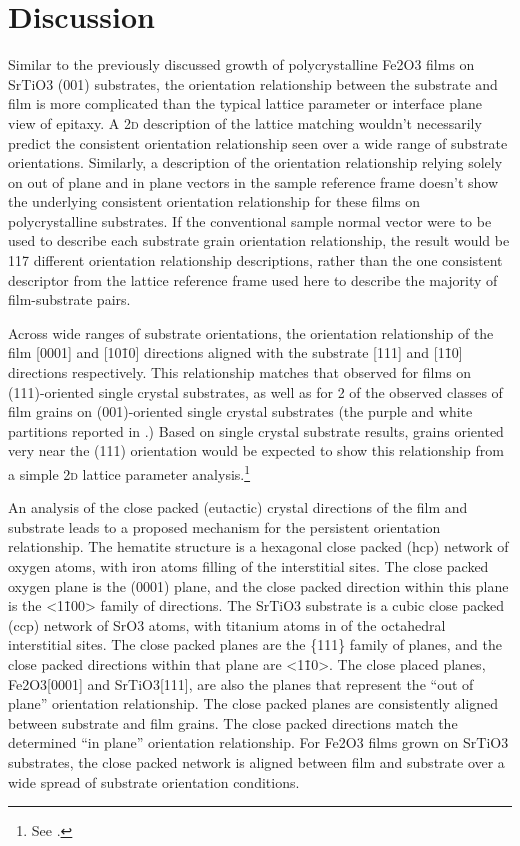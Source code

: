 \documentclass[12pt,%
              twoside,
               letterpaper]{uiothesis}
\begin{document}
\section{Discussion}
\label{sec:poly.growth.discussion}
		
		
Similar to the previously discussed growth of polycrystalline Fe2O3 films on
SrTiO3 (001) substrates, the orientation relationship between the substrate and film
is more complicated than the typical lattice parameter or interface plane view of epitaxy.
A 2\textsc{d} description of the lattice matching wouldn't necessarily predict the
consistent orientation relationship seen over a wide range of substrate orientations.
Similarly, a description of the orientation relationship relying solely on out of plane
and in plane vectors in the sample reference frame doesn't show the underlying consistent
orientation relationship for these films on polycrystalline substrates. If the
conventional sample normal vector were to be used to describe each substrate grain
orientation relationship, the result would be 117 different orientation relationship
descriptions, rather than the one consistent descriptor from the lattice reference frame
used here to describe the majority of film-substrate pairs.

Across wide ranges of substrate orientations, the orientation relationship of the film
[0001] and [10\={1}0] directions aligned with the substrate [111] and [1\={1}0] directions
respectively. This relationship matches that observed for films on (111)-oriented single
crystal substrates, as well as for 2 of the observed classes of film grains on
(001)-oriented single crystal substrates (the purple and white partitions reported in
.) Based on single crystal substrate
results, grains oriented very near the (111) orientation would be expected to show this
relationship from a simple 2\textsc{d} lattice parameter analysis.\footnote{See
.}

An analysis of the close packed (eutactic)\cite{OKeeffe:1977vx} crystal directions of the
film and substrate leads to a proposed mechanism for the persistent orientation
relationship. The hematite structure is a hexagonal close packed (hcp) network of oxygen
atoms, with iron atoms filling  of the interstitial sites. The close
packed oxygen plane is the (0001) plane, and the close packed direction within this plane
is the <1\={1}00> family of directions. The SrTiO3 substrate is a cubic close packed
(ccp) network of SrO3 atoms, with titanium atoms in  of the
octahedral interstitial sites. The close packed planes are the \{111\} family of planes,
and the close packed directions within that plane are <1\={1}0>. The close placed planes,
Fe2O3[0001] and SrTiO3[111], are also the planes that represent the ``out of
plane'' orientation relationship. The close packed planes are consistently aligned between
substrate and film grains. The close packed directions match the determined ``in plane''
orientation relationship. For Fe2O3 films grown on SrTiO3 substrates, the close
packed network is aligned between film and substrate over a wide spread of substrate
orientation conditions.
\end{document}
